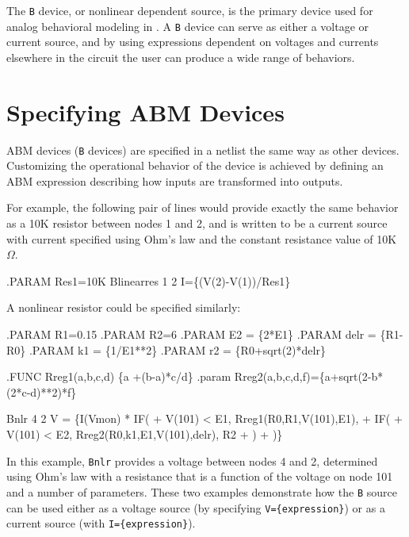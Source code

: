 The \verb+B+
 device, or nonlinear dependent source, is
the primary device used for analog behavioral modeling in \Xyce{}.  A
\verb+B+ device can serve as either a voltage or current source, and by using
expressions dependent on voltages and currents elsewhere in the
circuit the user can produce a wide range of behaviors.

\section{Specifying ABM Devices}
\label{ABM_Devices}

ABM devices (\verb+B+
devices) are specified in a netlist the same way as other devices.  Customizing
the operational behavior of the device is achieved by defining an ABM
expression describing how inputs are transformed into outputs.

For example, the following pair of lines would provide exactly the same
behavior as a 10K resistor between nodes 1 and 2, and is
written to be a current source with current specified using Ohm's
law and the constant resistance value of 10K $\Omega$.

\begin{vquote}
.PARAM Res1=10K
Blinearres 1 2 I=\{(V(2)-V(1))/Res1\}
\end{vquote}

A nonlinear resistor could be specified similarly:
\begin{vquote}
.PARAM R1=0.15
.PARAM R2=6
.PARAM E2 = \{2*E1\}
.PARAM delr = \{R1-R0\}
.PARAM k1 = \{1/E1**2\}
.PARAM r2 = \{R0+sqrt(2)*delr\}

.FUNC Rreg1(a,b,c,d) \{a +(b-a)*c/d\}
.param Rreg2(a,b,c,d,f)=\{a+sqrt(2-b*(2*c-d)**2)*f\}

Bnlr 4 2 V = \{I(Vmon) * IF(
+ V(101) < E1, Rreg1(R0,R1,V(101),E1),
+ IF(
+ V(101) < E2, Rreg2(R0,k1,E1,V(101),delr), R2
+ )
+ )\}
\end{vquote}

In this example, \verb+Bnlr+ provides a voltage between nodes 4 and 2,
determined using Ohm's law with a resistance that is a function of the
voltage on node 101 and a number of parameters.  These two examples
demonstrate how the \verb+B+ source can be used either as a voltage
source (by specifying \verb+V={expression}+) or as a current source
(with \verb+I={expression}+).

